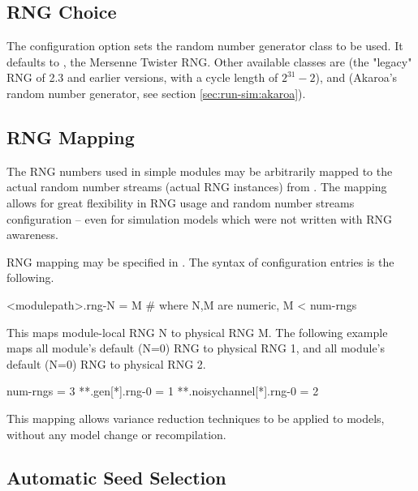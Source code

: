 \subsection{RNG Choice}
\label{sec:config-sim:rng-choice}

The  configuration option sets the random number
generator class to be used. It defaults to ,
the Mersenne Twister RNG. Other available classes are 
(the "legacy" RNG of {\opp} 2.3 and earlier versions, with a cycle length
of $2^{31}-2$), and  (Akaroa's random number generator,
see section \ref{sec:run-sim:akaroa}).

\subsection{RNG Mapping}
\label{sec:config-sim:rng-mapping}

The RNG numbers used in simple modules may be arbitrarily mapped to the
actual random number streams (actual RNG instances) from .
The mapping allows for great flexibility in RNG usage and random number
streams configuration -- even for simulation models which were not
written with RNG awareness.

RNG mapping may be specified in . The syntax of
configuration entries is the following.

\begin{inifile}
[General]
<modulepath>.rng-N = M  # where N,M are numeric, M < num-rngs
\end{inifile}

This maps module-local RNG N to physical RNG M. The following
example maps all  module's default (N=0) RNG to physical RNG 1,
and all  module's default (N=0) RNG to physical RNG 2.

\begin{inifile}
[General]
num-rngs = 3
**.gen[*].rng-0 = 1
**.noisychannel[*].rng-0 = 2
\end{inifile}

This mapping allows variance reduction techniques to be applied to
{\opp} models, without any model change or recompilation.


\subsection{Automatic Seed Selection}
\label{sec:config-sim:automatic-seed-selection}


